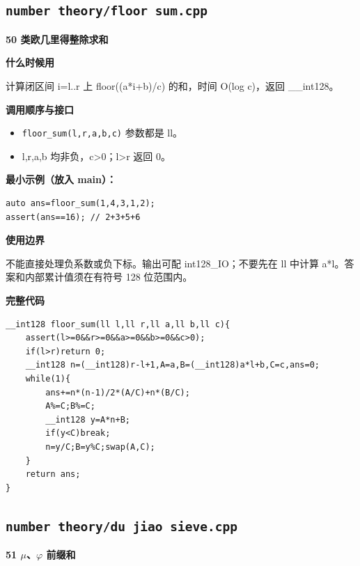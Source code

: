 \documentclass[UTF8,a4paper,10pt]{ctexart}
\newcommand{\TemplUsage}[1]{\textbf{什么时候用}\par #1\par}
\newcommand{\TemplApi}[1]{\textbf{调用顺序与接口}\par #1\par}
\newcommand{\TemplNote}[1]{\textbf{使用边界}\par #1\par}
\begin{document}
\subsection{\texttt{number theory/floor sum.cpp}}
\textbf{50 类欧几里得整除求和}

\TemplUsage{计算闭区间 i=l..r 上 floor((a*i+b)/c) 的和，时间 O(log c)，返回 \_\_int128。}
\TemplApi{\begin{itemize}
\item \texttt{floor\_sum(l,r,a,b,c)} 参数都是 ll。
\item l,r,a,b 均非负，c>0；l>r 返回 0。
\end{itemize}}
\textbf{最小示例（放入 main）：}
\begin{lstlisting}
auto ans=floor_sum(1,4,3,1,2);
assert(ans==16); // 2+3+5+6
\end{lstlisting}
\TemplNote{不能直接处理负系数或负下标。输出可配 int128\_IO；不要先在 ll 中计算 a*l。答案和内部累计值须在有符号 128 位范围内。}
\textbf{完整代码}
\begin{lstlisting}[firstnumber=1]
__int128 floor_sum(ll l,ll r,ll a,ll b,ll c){
	assert(l>=0&&r>=0&&a>=0&&b>=0&&c>0);
	if(l>r)return 0;
	__int128 n=(__int128)r-l+1,A=a,B=(__int128)a*l+b,C=c,ans=0;
	while(1){
		ans+=n*(n-1)/2*(A/C)+n*(B/C);
		A%=C;B%=C;
		__int128 y=A*n+B;
		if(y<C)break;
		n=y/C;B=y%C;swap(A,C);
	}
	return ans;
}
\end{lstlisting}
\par\vspace{1em}
\subsection{\texttt{number theory/du jiao sieve.cpp}}
\textbf{51 \ensuremath{\mu}、\ensuremath{\varphi} 前缀和}
\end{document}
